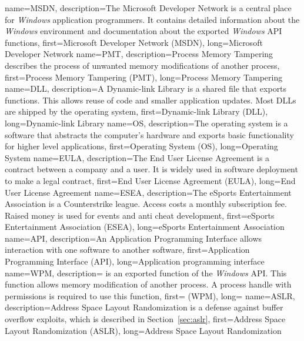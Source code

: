 {
  name={MSDN},
  description={The Microsoft Developer Network is a central place for \emph{Windows} application programmers. It contains detailed information about the \emph{Windows} environment and documentation about the exported \emph{Windows} API functions},
  first={Microsoft Developer Network (MSDN)},
  long={Microsoft Developer Network}
}
{
  name={PMT},
  description={Process Memory Tampering describes the process of unwanted memory modifications of another process},
  first={Process Memory Tampering (PMT)},
  long={Process Memory Tampering}
}
{
  name={DLL},
  description={A Dynamic-link Library is a shared file that exports functions. This allows reuse of code and smaller application updates. Most DLLs are shipped by the operating system},
  first={Dynamic-link Library (DLL)},
  long={Dynamic-link Library}
}
{
  name={OS},
  description={The operating system is a software that abstracts the computer's hardware and exports basic functionality for higher level applications},
  first={Operating System (OS)},
  long={Operating System}
}
{
  name={EULA},
  description={The End User License Agreement is a contract between a company and a user. It is widely used in software deployment to make a legal contract},
  first={End User License Agreement (EULA)},
  long={End User License Agreement}
}
{
  name={ESEA},
  description={The eSports Entertainment Association is a Counterstrike league. Access costs a monthly subscription fee. Raised money is used for events and anti cheat development},
  first={eSports Entertainment Association (ESEA)},
  long={eSports Entertainment Association}
}
{
  name={API},
  description={An Application Programming Interface allows interaction with one software to another software},
  first={Application Programming Interface (API)},
  long={Application programming interface}
}
{
  name={WPM},
  description={ is an exported function of the \emph{Windows} API. This function allows memory modification of another process. A process handle with  permissions is required to use this function},
  first={ (WPM)},
  long={}
}
{
  name={ASLR},
  description={Address Space Layout Randomization is a defense against buffer overflow exploits, which is described in Section~\ref{sec:aslr}},
  first={Address Space Layout Randomization (ASLR)},
  long={Address Space Layout Randomization}
}
